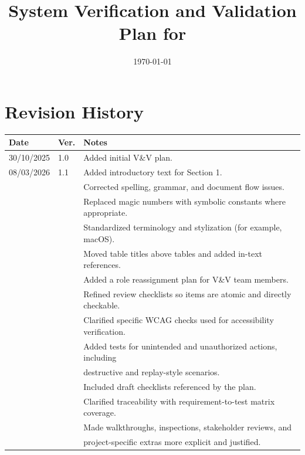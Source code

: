 \documentclass[12pt, titlepage]{article}
\begin{document}
\title{System Verification and Validation Plan for \progname{}}
\author{\authname}
\date{\today}

\maketitle


\section*{Revision History}

\begin{tabularx}{\textwidth}{p{2.3cm}p{1.1cm}X}
\toprule
\textbf{Date} & \textbf{Ver.} & \textbf{Notes} \\
\midrule
30/10/2025 & 1.0 & Added initial V\&V plan. \\
08/03/2026 & 1.1 & Added introductory text for Section 1. \\
 &  & Corrected spelling, grammar, and document flow issues. \\
 &  & Replaced magic numbers with symbolic constants where appropriate. \\
 &  & Standardized terminology and stylization (for example, macOS). \\
 &  & Moved table titles above tables and added in-text references. \\
 &  & Added a role reassignment plan for V\&V team members. \\
 &  & Refined review checklists so items are atomic and directly checkable. \\
 &  & Clarified specific WCAG checks used for accessibility verification. \\
 &  & Added tests for unintended and unauthorized actions, including \\
 &  & destructive and replay-style scenarios. \\
 &  & Included draft checklists referenced by the plan. \\
 &  & Clarified traceability with requirement-to-test matrix coverage. \\
 &  & Made walkthroughs, inspections, stakeholder reviews, and \\
 &  & project-specific extras more explicit and justified. \\
\bottomrule
\end{tabularx}

\newpage

\tableofcontents
\end{document}
